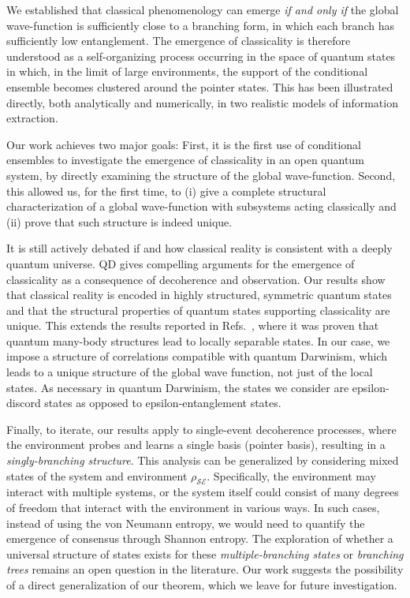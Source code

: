 \documentclass[a4paper,11pt,accepted=2024-09-14]{quantumarticle}
\newcommand{\+}         {\dagger}
\newcommand{\mc}[1]{\mathcal{#1}}
\begin{document}
We established that classical phenomenology can emerge \emph{if and only if} the global wave-function is sufficiently close to a branching form, in which each branch has sufficiently low entanglement. The emergence of classicality is therefore understood as a self-organizing process occurring in the space of quantum states in which, in the limit of large environments, the support of the {conditional ensemble} becomes clustered around the pointer states. This has been illustrated directly, both analytically and numerically, in two realistic models of information extraction.

Our work achieves two major goals: First, it is the first use of {conditional ensembles} to investigate the emergence of classicality in an open quantum system, by directly examining the structure of the global wave-function. Second, this allowed us, for the first time, to (i) give a complete structural characterization of a global wave-function with subsystems acting classically and (ii) prove that such structure is indeed unique. 

It is still actively debated if and how classical reality is consistent with a deeply quantum universe. QD gives compelling arguments for the emergence of classicality as a consequence of decoherence and observation. Our results show that classical reality is encoded in highly structured, symmetric quantum states and that the structural properties of quantum states supporting classicality are unique. This extends the results reported in Refs.~\cite{brandao2015generic,qi2021emergent}, where it was proven that quantum many-body structures lead to locally separable states. In our case, we impose a structure of correlations compatible with quantum Darwinism, which leads to a unique structure of the global wave function, not just of the local states. As necessary in quantum Darwinism, the states we consider are epsilon-discord states as opposed to epsilon-entanglement states.

Finally, to iterate, our results apply to single-event decoherence processes, where the environment probes and learns a single basis (pointer basis), resulting in a \textit{singly-branching structure}. This analysis can be generalized by considering mixed states of the system and environment $\rho_{\mc{SE}}$. Specifically, the environment may interact with multiple systems, or the system itself could consist of many degrees of freedom that interact with the environment in various ways. In such cases, instead of using the von Neumann entropy, we would need to quantify the emergence of consensus through Shannon entropy. The exploration of whether a universal structure of states exists for these \textit{multiple-branching states} or \textit{branching trees} remains an open question in the literature. Our work suggests the possibility of a direct generalization of our theorem, which we leave for future investigation.
\end{document}
